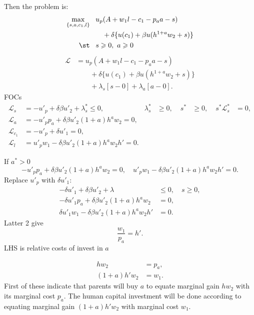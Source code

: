 \begin{frame}{}
Then the problem is:
\[
\begin{aligned}
\max_{\{s, a, c_{1}, l\}}
& \;\;\; u_{p}(A+w_{1}l-c_{1}-p_{a}a-s)\\
& \;\;\;\hspace{1em}+\delta \{u(c_{1})+\beta u(h^{1+a}w_{2}+s)\}\\
\st & \;\;\; s\geqslant 0, \ a\geqslant 0
\end{aligned}
\]
\[
\begin{aligned}
\mathcal L&=u_{p}(A+w_{1}l-c_{1}-p_{a}a-s)\\
&\hspace{2em}+\delta \{u(c_{1})+\beta u(h^{1+a}w_{2}+s)\}\\
&\hspace{2em}+\lambda_{s}[s-0]+\lambda_{a}[a-0].
\end{aligned}
\]
FOCs
\[
\begin{aligned}
\mathcal L_{s}&=-u'_{p}+\delta\beta u'_{2}+\lambda_{s}^{*}\leqslant 0,\; & \lambda_{s}^{*}&\geqslant 0, 
\; & s^{*}&\geqslant 0, \; & s^{*}\mathcal L_{s}^{*}&= 0,\\
\mathcal L_{a}&=-u'_{p}p_{a}+\delta\beta u'_{2}(1+a)h^{a}w_{2}= 0,\\
\mathcal L_{c_{1}}&=-u'_{p}+\delta u'_{1}=0,\\
\mathcal L_{l}&=u'_{p}w_{1}-\delta\beta u'_{2}(1+a)h^{a}w_{2}h'= 0.
\end{aligned}
\]
\end{frame}
\begin{frame}{}
If $a^{*}>0$
\[
-u'_{p}p_{a}+\delta\beta u'_{2}(1+a)h^{a}w_{2}= 0, \quad
u'_{p}w_{1}-\delta\beta u'_{2}(1+a)h^{a}w_{2}h'= 0.
\]
Replace $u'_{p}$ with $\delta u'_{1}$:
\[
\begin{aligned}
-\delta u'_{1}+\delta\beta u'_{2}+\lambda&\leqslant 0, \quad s\geqslant 0,\\
-\delta u'_{1}p_{a}+\delta\beta u'_{2}(1+a)h^{a}w_{2}&=0,\\
\delta u'_{1}w_{1}-\delta\beta u'_{2}(1+a)h^{a}w_{2}h'&= 0.
\end{aligned}
\]
Latter 2 give
\[
\frac{w_{1}}{p_{a}}=h'.
\]
LHS is relative costs of invest in $a$
\end{frame}
\begin{frame}{}
\[
\begin{aligned}
hw_{2}&=p_{a},\\
(1+a)h'w_{2}&=w_{1}.
\end{aligned}
\]
First of these indicate that parents will buy $a$ to equate marginal gain $hw_{2}$ 	with its marginal cost $p_{a}$. The human capital investment will be done according to equating marginal gain $(1+a)h'w_{2}$ with marginal cost $w_{1}$. 
\end{frame}
